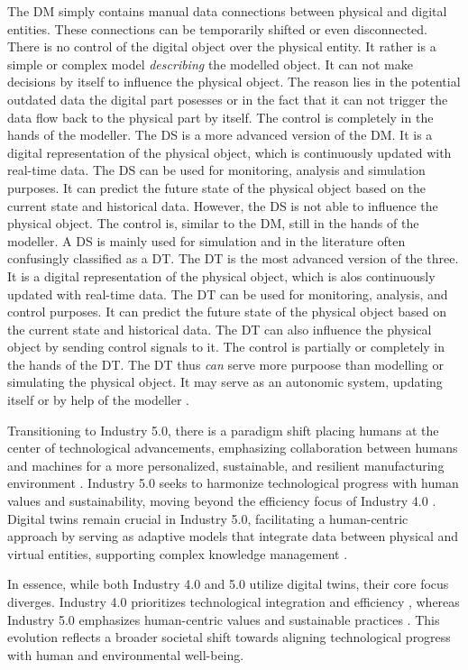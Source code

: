 The DM simply contains manual data connections between physical and digital entities. These connections can be temporarily shifted or even disconnected. There is no control of the digital object over the physical entity. It rather is a simple or complex model \textit{describing} the modelled object. It can not make decisions by itself to influence the physical object. The reason lies in the potential outdated data the digital part posesses or in the fact that it can not trigger the data flow back to the physical part by itself. The control is completely in the hands of the modeller.
The DS is a more advanced version of the DM. It is a digital representation of the physical object, which is continuously updated with real-time data. The DS can be used for monitoring, analysis and simulation purposes. It can predict the future state of the physical object based on the current state and historical data. However, the DS is not able to influence the physical object. The control is, similar to the DM, still in the hands of the modeller. A DS is mainly used for simulation and in the literature often confusingly classified as a DT. The DT is the most advanced version of the three. It is a digital representation of the physical object, which is alos continuously updated with real-time data. The DT can be used for monitoring, analysis, and control purposes. It can predict the future state of the physical object based on the current state and historical data. The DT can also influence the physical object by sending control signals to it. The control is partially or completely in the hands of the DT. The DT thus \textit{can} serve more purpoose than modelling or simulating the physical object. It may serve as an autonomic system, updating itself or by help of the modeller \parencite{kritzinger2018digital}.

Transitioning to Industry 5.0, there is a paradigm shift placing humans at the center of technological advancements, emphasizing collaboration between humans and machines for a more personalized, sustainable, and resilient manufacturing environment \parencite{Davim2023}. Industry 5.0 seeks to harmonize technological progress with human values and sustainability, moving beyond the efficiency focus of Industry 4.0 \parencite{Espina-Romero2023}. Digital twins remain crucial in Industry 5.0, facilitating a human-centric approach by serving as adaptive models that integrate data between physical and virtual entities, supporting complex knowledge management \parencite{Chryssolouris2024}.

In essence, while both Industry 4.0 and 5.0 utilize digital twins, their core focus diverges. Industry 4.0 prioritizes technological integration and efficiency \parencite{Lu2020}, whereas Industry 5.0 emphasizes human-centric values and sustainable practices \parencite{Leng2023}. This evolution reflects a broader societal shift towards aligning technological progress with human and environmental well-being.

